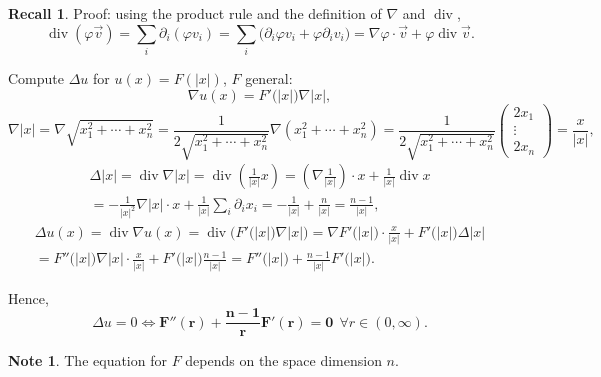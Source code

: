 \documentclass[12pt]{article}
\DeclareMathOperator{\diver}{div}
\theoremstyle{definition}
\newtheorem*{note}{Note}
\newtheorem*{recall}{Recall}
\begin{document}
\begin{recall}
Proof: using the product rule and the definition of $\nabla$ and $\diver$,
\[\diver(\varphi\vec{v})=\sum_i\partial_i(\varphi v_i)=\sum_i\big(\partial_i\varphi v_i+\varphi\partial_iv_i\big)=\nabla\varphi\cdot\vec{v}+\varphi\diver\vec{v}.\]
\end{recall}

Compute $\Delta u$ for $u(x)=F(|x|)$, $F$ general:
\[\nabla u(x)=F'\big(|x|\big)\nabla|x|,\]
\[\nabla|x|=\nabla\sqrt{x_1^2+\cdots+x_n^2}=\frac{1}{2\sqrt{x_1^2+\cdots+x_n^2}}\nabla(x_1^2+\cdots+x_n^2)=\frac{1}{2\sqrt{x_1^2+\cdots+x_n^2}}\left(\begin{matrix}2x_1\\\vdots\\2x_n\end{matrix}\right)=\frac{x}{|x|},\]
\begin{multline*}
\Delta|x|=\diver\nabla|x|=\diver\left(\frac{1}{|x|}x\right)=\left(\nabla\frac{1}{|x|}\right)\cdot x+\frac{1}{|x|}\diver x\\
=-\frac{1}{|x|^2}\nabla|x|\cdot x+\frac{1}{|x|}\sum_i\partial_ix_i=-\frac{1}{|x|}+\frac{n}{|x|}=\frac{n-1}{|x|},
\end{multline*}
\begin{multline*}
\Delta u(x)=\diver\nabla u(x)=\diver\big(F'\big(|x|\big)\nabla|x|\big)=\nabla F'\big(|x|\big)\cdot\frac{x}{|x|}+F'\big(|x|\big)\Delta|x|\\
=F''\big(|x|\big)\nabla|x|\cdot\frac{x}{|x|}+F'\big(|x|\big)\frac{n-1}{|x|}=F''\big(|x|\big)+\frac{n-1}{|x|}F'\big(|x|\big).
\end{multline*}

Hence,
\[\Delta u=0\Longleftrightarrow\boldsymbol{F''(r)+\frac{n-1}{r}F'(r)=0}\ \ \forall r\in(0,\infty).\]

\begin{note}
The equation for $F$ depends on the space dimension $n$.
\end{note}
\end{document}
